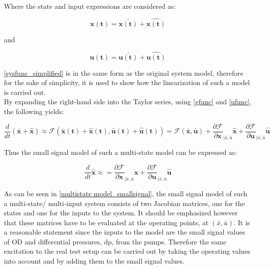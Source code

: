 Where the state and input expressions are considered as: 

\begin{equation}
\pmb{x(t)} = \pmb{\bar{x(t)}} + \pmb{\hat{x(t)}}
 \label{gfunc}
\end{equation}

and 

\begin{equation}
\pmb{u(t)} = \pmb{\bar{u(t)}} + \pmb{\hat{u(t)}}
 \label{ufunc}
\end{equation}

\eqref{sysfunc_simplified} is in the same form as the original system model, therefore for the sake of simplicity, it is used to show how the linearization of such a model is carried out. 
\\
By expanding the right-hand side into the Taylor series, using \eqref{gfunc} and \eqref{ufunc}, the following yields:

\begin{equation}
\frac{d}{dt} (\pmb{\bar{x}} + \pmb{\hat{x}})  \approx \mathcal{F}(\pmb{\bar{x}(t)} + \pmb{\hat{x}(t)}, \pmb{\bar{u}(t)} + \pmb{\hat{u}(t)} )
 = \mathcal{F}(\pmb{\bar{x}},\pmb{\bar{u}}) + \frac{\partial {\mathcal{F}}}{\partial \pmb{x}}_{|\bar{x}, \bar{u}} \pmb{\hat{x}} + \frac{\partial {\mathcal{F}}}{\partial \pmb{u}}_{|\bar{x}, \bar{u}} \pmb{\hat{u}} 
 \label{multistate model_full}
\end{equation}

Thus the small signal model of such a multi-state model can be expressed as: 

\begin{equation}
\frac{d}{dt} \pmb{\hat{x}}  \approx
 = \frac{\partial {\mathcal{F}}}{\partial \pmb{x}}_{|\bar{x}, \bar{u}} \pmb{\hat{x}} + \frac{\partial {\mathcal{F}}}{\partial \pmb{u}}_{|\bar{x}, \bar{u}} \pmb{\hat{u}} 
 \label{multistate model_smallsignal}
\end{equation}

%

As can be seen in \eqref{multistate model_smallsignal}, the small signal model of such a multi-state/ multi-input system consists of two Jacobian matrices, one for the states and one for the inputs to the system. It should be emphasized however that these matrices have to be evaluated at the operating points, at $(\bar{x}, \bar{u})$. It is a reasonable statement since the inputs to the model are the small signal values of OD and differential pressures, dp, from the pumps. Therefore the same excitation to the real test setup can be carried out by taking the operating values into account and by adding them to the small signal values. 
\\

